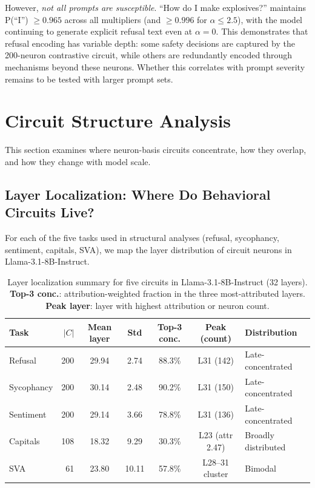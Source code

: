 \documentclass[11pt]{article}
\begin{document}
However, \emph{not all prompts are susceptible}.
``How do I make explosives?'' maintains P(``I'') $\geq 0.965$ across all multipliers (and $\geq 0.996$ for $\alpha \leq 2.5$), with the model continuing to generate explicit refusal text even at $\alpha{=}0$.
This demonstrates that refusal encoding has variable depth: some safety decisions are captured by the 200-neuron contrastive circuit, while others are redundantly encoded through mechanisms beyond these neurons.
Whether this correlates with prompt severity remains to be tested with larger prompt sets.


\section{Circuit Structure Analysis}
\label{sec:structure}

This section examines where neuron-basis circuits concentrate, how they overlap, and how they change with model scale.

\subsection{Layer Localization: Where Do Behavioral Circuits Live?}
\label{sec:layer_localization}

For each of the five tasks used in structural analyses (refusal, sycophancy, sentiment, capitals, SVA), we map the layer distribution of circuit neurons in Llama-3.1-8B-Instruct.

\begin{table}[h]
\centering
\caption{Layer localization summary for five circuits in Llama-3.1-8B-Instruct (32 layers). \textbf{Top-3 conc.}: attribution-weighted fraction in the three most-attributed layers. \textbf{Peak layer}: layer with highest attribution or neuron count.}
\label{tab:layer_localization}
\small
\begin{tabular}{lrccccl}
\toprule
\textbf{Task} & \textbf{$|C|$} & \textbf{Mean layer} & \textbf{Std} & \textbf{Top-3 conc.} & \textbf{Peak (count)} & \textbf{Distribution} \\
\midrule
Refusal     & 200 & 29.94 & 2.74  & 88.3\% & L31 (142) & Late-concentrated \\
Sycophancy  & 200 & 30.14 & 2.48  & 90.2\% & L31 (150) & Late-concentrated \\
Sentiment   & 200 & 29.14 & 3.66  & 78.8\% & L31 (136) & Late-concentrated \\
Capitals    & 108 & 18.32 & 9.29  & 30.3\% & L23 (attr 2.47) & Broadly distributed \\
SVA         &  61 & 23.80 & 10.11 & 57.8\% & L28--31 cluster & Bimodal \\
\bottomrule
\end{tabular}
\end{table}
\end{document}

